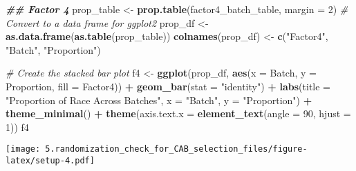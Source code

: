 \documentclass[
]{article}
\newenvironment{Shaded}{\begin{snugshade}}{\end{snugshade}}
\newcommand{\AttributeTok}[1]{\textcolor[rgb]{0.13,0.29,0.53}{#1}}
\newcommand{\CommentTok}[1]{\textcolor[rgb]{0.56,0.35,0.01}{\textit{#1}}}
\newcommand{\DecValTok}[1]{\textcolor[rgb]{0.00,0.00,0.81}{#1}}
\newcommand{\DocumentationTok}[1]{\textcolor[rgb]{0.56,0.35,0.01}{\textbf{\textit{#1}}}}
\newcommand{\FunctionTok}[1]{\textcolor[rgb]{0.13,0.29,0.53}{\textbf{#1}}}
\newcommand{\NormalTok}[1]{#1}
\newcommand{\OtherTok}[1]{\textcolor[rgb]{0.56,0.35,0.01}{#1}}
\newcommand{\SpecialCharTok}[1]{\textcolor[rgb]{0.81,0.36,0.00}{\textbf{#1}}}
\newcommand{\StringTok}[1]{\textcolor[rgb]{0.31,0.60,0.02}{#1}}
\begin{document}
\begin{Shaded}
\begin{Highlighting}[]
\DocumentationTok{\#\# Factor 4}
\NormalTok{prop\_table }\OtherTok{\textless{}{-}} \FunctionTok{prop.table}\NormalTok{(factor4\_batch\_table, }\AttributeTok{margin =} \DecValTok{2}\NormalTok{)}
\CommentTok{\# Convert to a data frame for ggplot2}
\NormalTok{prop\_df }\OtherTok{\textless{}{-}} \FunctionTok{as.data.frame}\NormalTok{(}\FunctionTok{as.table}\NormalTok{(prop\_table))}
\FunctionTok{colnames}\NormalTok{(prop\_df) }\OtherTok{\textless{}{-}} \FunctionTok{c}\NormalTok{(}\StringTok{"Factor4"}\NormalTok{, }\StringTok{"Batch"}\NormalTok{, }\StringTok{"Proportion"}\NormalTok{)}

\CommentTok{\# Create the stacked bar plot}
\NormalTok{f4 }\OtherTok{\textless{}{-}} \FunctionTok{ggplot}\NormalTok{(prop\_df, }\FunctionTok{aes}\NormalTok{(}\AttributeTok{x =}\NormalTok{ Batch, }\AttributeTok{y =}\NormalTok{ Proportion, }\AttributeTok{fill =}\NormalTok{ Factor4)) }\SpecialCharTok{+}
  \FunctionTok{geom\_bar}\NormalTok{(}\AttributeTok{stat =} \StringTok{"identity"}\NormalTok{) }\SpecialCharTok{+}
  \FunctionTok{labs}\NormalTok{(}\AttributeTok{title =} \StringTok{"Proportion of Race Across Batches"}\NormalTok{, }\AttributeTok{x =} \StringTok{"Batch"}\NormalTok{, }\AttributeTok{y =} \StringTok{"Proportion"}\NormalTok{) }\SpecialCharTok{+}
  \FunctionTok{theme\_minimal}\NormalTok{() }\SpecialCharTok{+}
  \FunctionTok{theme}\NormalTok{(}\AttributeTok{axis.text.x =} \FunctionTok{element\_text}\NormalTok{(}\AttributeTok{angle =} \DecValTok{90}\NormalTok{, }\AttributeTok{hjust =} \DecValTok{1}\NormalTok{))}
\NormalTok{f4}
\end{Highlighting}
\end{Shaded}

\texttt{[image: 5.randomization\_check\_for\_CAB\_selection\_files/figure-latex/setup-4.pdf]}
\end{document}
